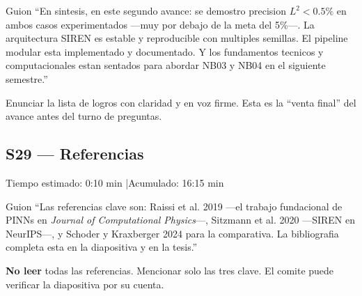 \begin{slidebox}{Guion}
``En sintesis, en este segundo avance: se demostro precision $L^2 < 0.5\%$ en
ambos casos experimentados ---muy por debajo de la meta del 5\%---. La arquitectura
SIREN es estable y reproducible con multiples semillas. El pipeline modular esta
implementado y documentado. Y los fundamentos tecnicos y computacionales estan
sentados para abordar NB03 y NB04 en el siguiente semestre.''
\end{slidebox}
\vspace{4pt}

\begin{tipbox}
Enunciar la lista de logros con claridad y en voz firme. Esta es la ``venta final''
del avance antes del turno de preguntas.
\end{tipbox}

\vspace{8pt}

\subsection{S29 --- Referencias}

\begin{timebox}
Tiempo estimado: 0:10 min \quad|\quad Acumulado: 16:15 min
\end{timebox}
\vspace{4pt}

\begin{slidebox}{Guion}
``Las referencias clave son: Raissi et al. 2019 ---el trabajo fundacional de PINNs
en \emph{Journal of Computational Physics}---, Sitzmann et al. 2020 ---SIREN en
NeurIPS---, y Schoder y Kraxberger 2024 para la comparativa. La bibliografia
completa esta en la diapositiva y en la tesis.''
\end{slidebox}
\vspace{4pt}

\begin{tipbox}
\textbf{No leer} todas las referencias. Mencionar solo las tres clave.
El comite puede verificar la diapositiva por su cuenta.
\end{tipbox}

\vspace{8pt}

